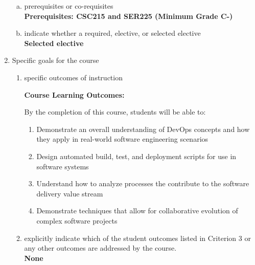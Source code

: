 \begin{enumerate}[1.]
\begin{enumerate}[a.]
\item prerequisites or co-requisites\\
  {\bfseries
    Prerequisites: CSC215 and SER225 (Minimum Grade C-)
  }

\item indicate whether a required, elective, or selected elective\\ %
  {\bfseries
    Selected elective
  }

\end{enumerate}

\item Specific goals for the course
\begin{enumerate}
\item specific outcomes of instruction\\ %
  {\bfseries
    Course Learning Outcomes:

    By the completion of this course, students will be able to:
\begin{enumerate}
\item Demonstrate an overall understanding of DevOps concepts and how they apply in real-world software engineering scenarios
\item Design automated build, test, and deployment scripts for use in software systems
\item Understand how to analyze processes the contribute to the software delivery value stream
\item Demonstrate techniques that allow for collaborative evolution of complex software projects
\end{enumerate}
  }

\item explicitly indicate which of the student outcomes listed in Criterion 3 or any other outcomes are addressed by the course.\\
  {\bfseries
    None
  }
\end{enumerate}


\end{enumerate}
